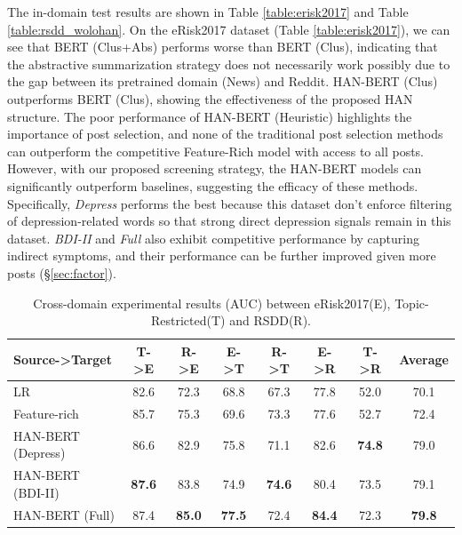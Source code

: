 The in-domain test results are shown in Table \ref{table:erisk2017} and Table \ref{table:rsdd_wolohan}. On the eRisk2017 dataset (Table \ref{table:erisk2017}), we can see that BERT (Clus+Abs) performs worse than BERT (Clus), indicating that the abstractive summarization strategy does not necessarily work possibly due to the gap between its pretrained domain (News) and Reddit. HAN-BERT (Clus) outperforms BERT (Clus), showing the effectiveness of the proposed HAN structure. The poor performance of HAN-BERT (Heuristic) highlights the importance of post selection, and none of the traditional post selection methods can outperform the competitive Feature-Rich model with access to all posts. However, with our proposed screening strategy, the HAN-BERT models can significantly outperform baselines, suggesting the efficacy of these methods. Specifically, \textit{Depress} performs the best because this dataset don't enforce filtering of depression-related words so that strong direct depression signals remain in this dataset. \textit{BDI-II} and \textit{Full} also exhibit competitive performance by capturing indirect symptoms, and their performance can be further improved given more posts (\S \ref{sec:factor}). 


\begin{table}[t]
    \centering
	\small
    \begin{tabular}{l|cccccc|c}
        \hline
            Source->Target & T->E & R->E & E->T & R->T & E->R & T->R & Average  \\ 
            \hline
            LR & 82.6 & 72.3 & 68.8 & 67.3 & 77.8 & 52.0 & 70.1  \\
            Feature-rich & 85.7 & 75.3 & 69.6 & 73.3 & 77.6 & 52.7 & 72.4 \\ 
            \hline
            HAN-BERT (Depress) & 86.6 & 82.9 & 75.8 & 71.1 & 82.6 & \textbf{74.8} & 79.0  \\
            HAN-BERT (BDI-II) & \textbf{87.6} & 83.8 & 74.9 & \textbf{74.6} & 80.4 & 73.5 & 79.1  \\
            HAN-BERT (Full) & 87.4 & \textbf{85.0} & \textbf{77.5} & 72.4 & \textbf{84.4} & 72.3 & \textbf{79.8} \\ 
            \hline
        \end{tabular}
    \caption{\label{table:cross} Cross-domain experimental results (AUC) between eRisk2017(E), Topic-Restricted(T) and RSDD(R).}
\end{table}


